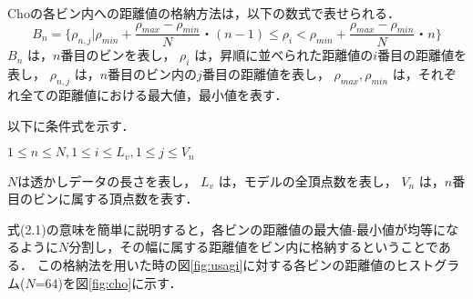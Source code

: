 \documentclass[11pt]{jreport}
\begin{document}
{Choの各ビン内への距離値の格納方法は，以下の数式で表せられる．
\begin{equation}
B_n=\{{\rho_{n,j}}|\rho_{min}+\frac{\rho_{max}-\rho_{min}}{N}・(n-1)\le \rho_i<\rho_{min}+\frac{\rho_{max}-\rho_{min}}{N}・n\}
\end{equation}
\begin{math}
B_n
 \end{math}
は，\begin{math}n\end{math}番目のビンを表し，
\begin{math}
\rho_i
 \end{math}
は，昇順に並べられた距離値の\begin{math}i\end{math}番目の距離値を表し，
\begin{math}
\rho_{n,j}
 \end{math}
は，\begin{math}n\end{math}番目のビン内の\begin{math}j\end{math}番目の距離値を表し，
\begin{math}
\rho_{max},\rho_{min}
 \end{math}
は，それぞれ全ての距離値における最大値，最小値を表す．\par
以下に条件式を示す．
\begin{center}
\begin{math}
1\le n \le N, 1\le i \le L_v,1\le j \le V_n
 \end{math}\par
\end{center}
\begin{math}N\end{math}は透かしデータの長さを表し，
\begin{math}
L_v
 \end{math}
は，モデルの全頂点数を表し，
\begin{math}
V_n
 \end{math}
は，\begin{math}n\end{math}番目のビンに属する頂点数を表す．

式(2.1)の意味を簡単に説明すると，各ビンの距離値の最大値-最小値が均等になるように\begin{math}N \end{math}分割し，その幅に属する距離値をビン内に格納するということである．
この格納法を用いた時の図\ref{fig:usagi}に対する各ビンの距離値のヒストグラム(\begin{math}N\end{math}=64)を図\ref{fig:cho}に示す．


}
\end{document}
